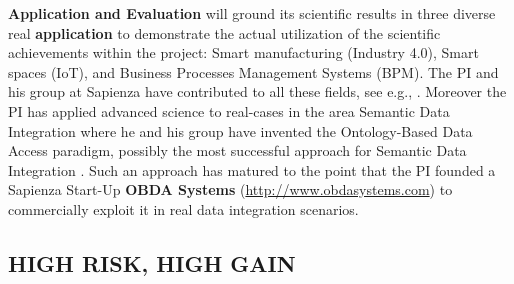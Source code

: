 \textbf{Application and Evaluation}
\project will ground its scientific results in three
diverse real \textbf{application} to demonstrate the actual utilization of the scientific
achievements within the project: Smart manufacturing (Industry 4.0),
 Smart spaces (IoT), and
Business Processes Management Systems (BPM).
The PI and his group at Sapienza have
contributed to all these fields, see e.g.,
\cite{DeGiacomoCFHM12,DeGiacomoDMM15,SilvaFCLSR17}.  Moreover the PI
has applied advanced science to real-cases in the
area Semantic Data Integration where he and his group have invented the Ontology-Based Data Access paradigm, possibly the
most successful approach for Semantic Data Integration \cite{PoggiLCGLR08,SequedaM17,Statoil17}.
Such an approach has matured to the point that  the PI
founded a Sapienza Start-Up \textbf{OBDA Systems}
(\url{http://www.obdasystems.com}) to commercially exploit it in real data integration scenarios. 








\vspace{-3ex}
\subsection*{HIGH RISK, HIGH GAIN}

\vspace{-3ex}

